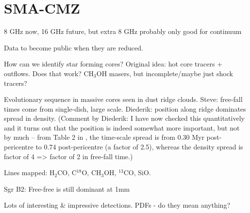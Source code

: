 \section{SMA-CMZ}
8 GHz now, 16 GHz future, but extra 8 GHz probably only good for continuum

Data to become public when they are reduced.

How can we identify star forming cores?  Original idea: hot core tracers + outflows.  Does that work? CH$_3$OH masers, but incomplete/maybe just shock tracers?

Evolutionary sequence in massive cores seen in dust ridge clouds.  Steve: free-fall times come from single-dish, large scale.  Diederik: position along ridge dominates spread in density. (Comment by Diederik: I have now checked this quantitatively and it turns out that the position is indeed somewhat more important, but not by much -- from Table 2 in \citet{Kruijssen2015a}, the time-scale spread is from 0.30 Myr post-pericentre to 0.74 post-pericentre (a factor of 2.5), whereas the density spread is factor of 4 => factor of 2 in free-fall time.)

Lines mapped: H$_2$CO, C$^{18}$O, CH$_3$OH, $^{13}$CO, SiO.

Sgr B2: Free-free is still dominant at 1mm

Lots of interesting & impressive detections.  PDFs - do they mean anything?